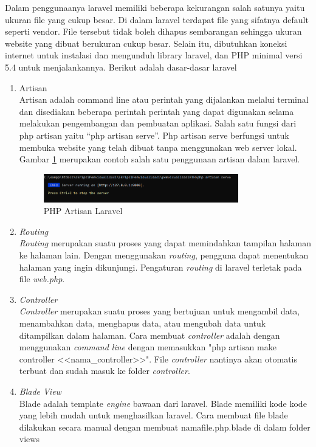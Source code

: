 Dalam penggunaanya laravel memiliki beberapa kekurangan salah satunya yaitu ukuran file yang cukup besar. Di dalam laravel terdapat file yang sifatnya default seperti vendor. File tersebut tidak boleh dihapus sembarangan sehingga ukuran website yang dibuat berukuran cukup besar. Selain itu, dibutuhkan koneksi internet untuk instalasi dan mengunduh library laravel, dan PHP minimal versi 5.4 untuk menjalankannya. Berikut adalah dasar-dasar laravel
\begin{enumerate}
	\item Artisan \\
	Artisan adalah command line atau perintah yang dijalankan melalui terminal dan disediakan beberapa perintah perintah yang dapat digunakan selama melakukan pengembangan dan pembuatan aplikasi. Salah satu fungsi dari php artisan yaitu “php artisan serve”. Php artisan serve berfungsi untuk membuka website yang telah dibuat tanpa menggunakan web server lokal. Gambar \ref{fig:artisan} merupakan contoh salah satu penggunaan artisan dalam laravel.
	
	\begin{figure}[H]
		\centering
		\includegraphics[width=0.8\textwidth]{Gambar/artisan.png}
		\caption{PHP Artisan Laravel}
		\label{fig:artisan}
	\end{figure}
	
	\item \textit{Routing} \\
	\textit{Routing} merupakan suatu proses yang dapat memindahkan tampilan halaman ke halaman lain. Dengan menggunakan \textit{routing}, pengguna dapat menentukan halaman yang ingin dikunjungi. Pengaturan \textit{routing} di laravel terletak pada file \textit{web.php}.
	
	\item \textit{Controller} \\
	\textit{Controller} merupakan suatu proses yang bertujuan untuk mengambil data, menambahkan data, menghapus data, atau mengubah data untuk ditampilkan dalam halaman. Cara membuat \textit{controller} adalah dengan menggunakan \textit{command line} dengan memasukkan "php artisan make controller <<nama\_controller>>". File \textit{controller} nantinya akan otomatis terbuat dan sudah masuk ke folder \textit{controller}.
	
	\item \textit{Blade View} \\
	Blade adalah template \textit{engine} bawaan dari laravel. Blade memiliki kode kode yang lebih mudah untuk menghasilkan laravel. Cara membuat file blade dilakukan secara manual dengan membuat nama\textunderscore file.php.blade di dalam folder views
\end{enumerate}

